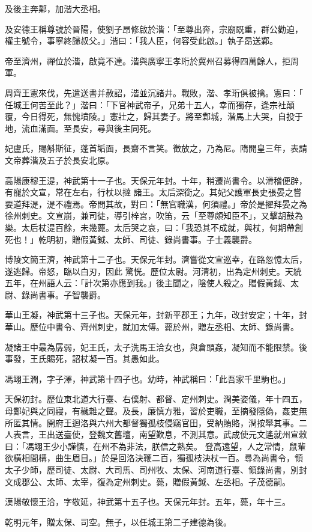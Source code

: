 \begin{pinyinscope}
 及後主奔鄴，加湝大丞相。



 及安德王稱尊號於晉陽，使劉子昂修啟於湝：「至尊出奔，宗廟既重，群公勸迫，權主號令，事寧終歸叔父。」湝曰：「我人臣，何容受此啟。」執子昂送鄴。



 帝至濟州，禪位於湝，啟竟不達。湝與廣寧王孝珩於冀州召募得四萬餘人，拒周軍。



 周齊王憲來伐，先遣送書并赦詔，湝並沉諸井。戰敗，湝、孝珩俱被擒。憲曰：「
 任城王何苦至此？」湝曰：「下官神武帝子，兄弟十五人，幸而獨存，逢宗社顛覆，今日得死，無愧墳陵。」憲壯之，歸其妻子。將至鄴城，湝馬上大哭，自投于地，流血滿面。至長安，尋與後主同死。



 妃盧氏，賜斛斯征，蓬首垢面，長齋不言笑。徵放之，乃為尼。隋開皇三年，表請文帝葬湝及五子於長安北原。



 高陽康穆王湜，神武第十一子也。天保元年封。十年，稍遷尚書令。以滑稽便辟，有寵於文宣，常在左右，行杖以撻
 諸王。太后深銜之。其妃父護軍長史張晏之嘗要道拜湜，湜不禮焉。帝問其故，對曰：「無官職漢，何須禮。」帝於是擢拜晏之為徐州刺史。文宣崩，兼司徒，導引梓宮，吹笛，云「至尊頗知臣不」，又擊胡鼓為樂。太后杖湜百餘，未幾薨。太后哭之哀，曰：「我恐其不成就，與杖，何期帶創死也！」乾明初，贈假黃鉞、太師、司徒、錄尚書事。子士義襲爵。



 博陵文簡王濟，神武第十二子也。天保元年封。濟嘗從文宣巡幸，在路忽憶太后，遂逃歸。帝怒，臨以白刃，因此
 驚恍。歷位太尉。河清初，出為定州刺史。天統五年，在州語人云：「計次第亦應到我。」後主聞之，陰使人殺之。贈假黃鉞、太尉、錄尚書事。子智襲爵。



 華山王凝，神武第十三子也。天保元年，封新平郡王；九年，改封安定；十年，封華山。歷位中書令、齊州刺史，就加太傅。薨於州，贈左丞相、太師、錄尚書。



 凝諸王中最為孱弱，妃王氏，太子洗馬王洽女也，與倉頭姦，凝知而不能限禁。後事發，王氏賜死，詔杖凝一百。其愚如此。



 馮翊王潤，字子澤，神武第十四子也。幼時，神武稱曰：「此吾家千里駒也。」



 天保初封。歷位東北道大行臺、右僕射、都督、定州刺史。潤美姿儀，年十四五，母鄭妃與之同寢，有穢雜之聲。及長，廉慎方雅，習於吏職，至摘發隱偽，姦吏無所匿其情。開府王迴洛與六州大都督獨孤枝侵竊官田，受納賄賂，潤按舉其事。二人表言，王出送臺使，登魏文舊壇，南望歎息，不測其意。武成使元文遙就州宣敕曰：「馮翊王少小謹慎，在州不為非法，朕信之熟矣。
 登高遠望，人之常情，鼠輩欲橫相間構，曲生眉目。」於是回洛決鞭二百，獨孤枝決杖一百。尋為尚書令，領太子少師，歷司徒、太尉、大司馬、司州牧、太保、河南道行臺、領錄尚書，別封文成郡公、太師、太宰，復為定州刺史。薨，贈假黃鉞、左丞相。子茂德嗣。



 漢陽敬懷王洽，字敬延，神武第十五子也。天保元年封。五年，薨，年十三。



 乾明元年，贈太保、司空。無子，以任城王第二子建德為後。



\end{pinyinscope}
